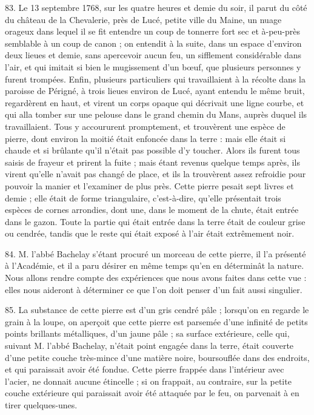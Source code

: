 \documentclass[a4paper, 11pt, oneside, polutonikogreek, french]{article}
\begin{document}
83. Le 13 septembre 1768, sur les quatre heures et demie du soir, il parut du côté du château de la Chevalerie, près de Lucé, petite ville du Maine, un nuage orageux dans lequel il se fit entendre un coup de tonnerre fort sec et à-peu-près semblable à un coup de canon ; on entendit à la suite, dans un espace d'environ deux lieues et demie, sans apercevoir aucun feu, un sifflement considérable dans l'air, et qui imitait si bien le mugissement d'un bœuf, que plusieurs personnes y furent trompées. Enfin, plusieurs particuliers qui travaillaient à la récolte dans la paroisse de Périgné, à trois lieues environ de Lucé, ayant entendu le même bruit, regardèrent en haut, et virent un corps opaque qui décrivait une ligne courbe, et qui alla tomber sur une pelouse dans le grand chemin du Mans, auprès duquel ils travaillaient. Tous y accoururent promptement, et trouvèrent une espèce de pierre, dont environ la moitié était enfoncée dans la terre : mais elle était si chaude et si brûlante qu'il n'était pas possible d'y toucher. Alors ils furent tous saisis de frayeur et prirent la fuite ; mais étant revenus quelque temps après, ils virent qu'elle n'avait pas changé de place, et ils la trouvèrent assez refroidie pour pouvoir la manier et l'examiner de plus près. Cette pierre pesait sept livres et demie ; elle était de forme triangulaire, c'est-à-dire, qu'elle présentait trois espèces de cornes arrondies, dont une, dans le moment de la chute, était entrée dans le gazon. Toute la partie qui était entrée dans la terre était de couleur grise ou cendrée, tandis que le reste qui était exposé à l'air était extrêmement noir.

84. M. l'abbé Bachelay s'étant procuré un morceau de cette pierre, il l'a présenté à l'Académie, et il a paru désirer en même temps qu'en en déterminât la nature. Nous allons rendre compte des expériences que nous avons faites dans cette vue : elles nous aideront à déterminer ce que l'on doit penser d'un fait aussi singulier.

85. La substance de cette pierre est d'un gris cendré pâle ; lorsqu'on en regarde le grain à la loupe, on aperçoit que cette pierre est parsemée d'une infinité de petits points brillants métalliques, d'un jaune pâle ; sa surface extérieure, celle qui, suivant M. l'abbé Bachelay, n'était point engagée dans la terre, était couverte d'une petite couche très-mince d'une matière noire, boursouflée dans des endroits, et qui paraissait avoir été fondue. Cette pierre frappée dans l'intérieur avec l'acier, ne donnait aucune étincelle ; si on frappait, au contraire, sur la petite couche extérieure qui paraissait avoir été attaquée par le feu, on parvenait à en tirer quelques-unes.
\end{document}
